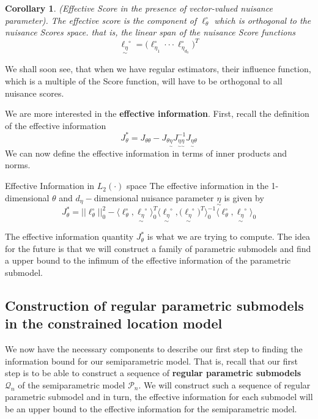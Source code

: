 \documentclass[twoside]{article}
\newtheorem{corollary}[theorem]{Corollary}
\newcommand{\utilde}{\underset{\sim}}
\begin{document}
\begin{corollary}(Effective Score in the presence of vector-valued nuisance parameter). The effective score is the component of $\ell_{\theta}^{\circ}$ which is orthogonal to the nuisance Scores space. that is, the linear span of the nuisance Score functions 
$$
\utilde{\ell_{\eta}}^{\circ} = \big(\ell_{\eta_{1}}^{\circ} \cdot \cdot \cdot \ell_{\eta_{d_{\eta}}}^{\circ} \big)^T
$$
\end{corollary}

We shall soon see, that when we have regular estimators, their influence function, which is a multiple of the Score function, will have to be orthogonal to all nuisance scores.

We are more interested in the \textbf{effective information}. First, recall the definition of the effective information 
$$
J_{\theta}^{*} = J_{\theta \theta} - J_{\theta \utilde{\eta}}J_{\utilde{\eta} \utilde{\eta}}^{-1}J_{\utilde{\eta} \theta}
$$
We can now define the effective information in terms of inner products and norms.
\begin{proposition_exam}{Effective Information in $L_2(\cdot)$ space}{} The effective information in the 1-dimensional $\theta$ and $d_{\eta}-$dimensional nuisance parameter $\utilde{\eta}$ is given by 
\begin{equation}
  J_{\theta}^{*} = ||\ell_{\theta}^{\circ}||_{0}^2 - \langle \ell_{\theta}^{\circ}, \utilde{\ell_{\eta}}^{\circ}\rangle_{0}^{T} \langle \utilde{\ell_{\eta}}^{\circ}, \big(\utilde{\ell_{\eta}}^{\circ}\big)^{T}\rangle_{0}^{-1} \langle \ell_{\theta}^{\circ}, \utilde{\ell_{\eta}}^{\circ}\rangle_{0}
\end{equation}
\end{proposition_exam}

The effective information quantity $J_{\theta}^{*}$ is what we are trying to compute. The idea for the future is that we will construct a family of parametric submodels and find a upper bound to the infimum of the effective information of the parametric submodel.

\subsection{Construction of regular parametric submodels in the constrained location model}
We now have the necessary components to describe our first step to finding the information bound for our semiparametric model. That is, recall that our first step is to be able to construct a sequence of \textbf{regular parametric submodels} $\mathcal{Q}_n$ of the semiparametric model $\mathcal{P}_n.$ We will construct such a sequence of regular parametric submodel and in turn, the effective information for each submodel will be an upper bound to the effective information for the semiparametric model.
\end{document}
